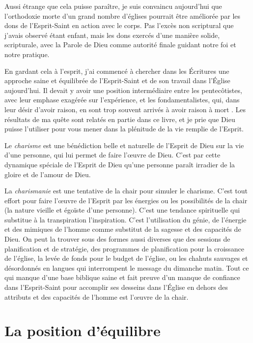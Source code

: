 Aussi étrange que cela puisse paraître, je suis convaincu aujourd'hui que l'orthodoxie morte d'un grand nombre d'églises pourrait être améliorée par les dons de l'Esprit-Saint en action avec le corps. Pas l'excès non scriptural que j'avais observé étant enfant, mais les dons exercés d'une manière solide, scripturale, avec la Parole de Dieu comme autorité finale guidant notre foi et notre pratique.

En gardant cela à l'esprit, j'ai commencé à chercher dans les Écritures une approche saine et équilibrée de l'Esprit-Saint et de son travail dans l'Église aujourd'hui. Il devait y avoir une position intermédiaire entre les pentecôtistes, avec leur emphase exagérée sur l'expérience, et les fondamentalistes, qui, dans leur désir d'avoir raison, en sont trop souvent arrivés à avoir raison à mort . Les résultats de ma quête sont relatés en partie dans ce livre, et je prie que Dieu puisse l'utiliser pour vous mener dans la plénitude de la vie remplie de l'Esprit.

Le \emph{charisme} est une bénédiction belle et naturelle de l'Esprit de Dieu sur la vie d'une personne, qui lui permet de faire l'œuvre de Dieu. C'est par cette dynamique spéciale de l'Esprit de Dieu qu'une personne paraît irradier de la gloire et de l'amour de Dieu.

La \emph{charismanie} est une tentative de la chair pour simuler le charisme. C'est tout effort pour faire l'œuvre de l'Esprit par les énergies ou les possibilités de la chair (la nature vieille et égoïste d'une personne). C'est une tendance spirituelle qui substitue à la transpiration l'inspiration. C'est l'utilisation du génie, de l'énergie et des mimiques de l'homme comme substitut de la sagesse et des capacités de Dieu. On peut la trouver sous des formes aussi diverses que des sessions de planification et de stratégie, des programmes de planification pour la croissance de l'église, la levée de fonds pour le budget de l'église, ou les chahuts sauvages et désordonnés en langues qui interrompent le message du dimanche matin. Tout ce qui manque d'une base biblique saine et fait preuve d'un manque de confiance dans l'Esprit-Saint pour accomplir ses desseins dans l'Église en dehors des attributs et des capacités de l'homme est l'œuvre de la chair.

\section*{La position d'équilibre}

